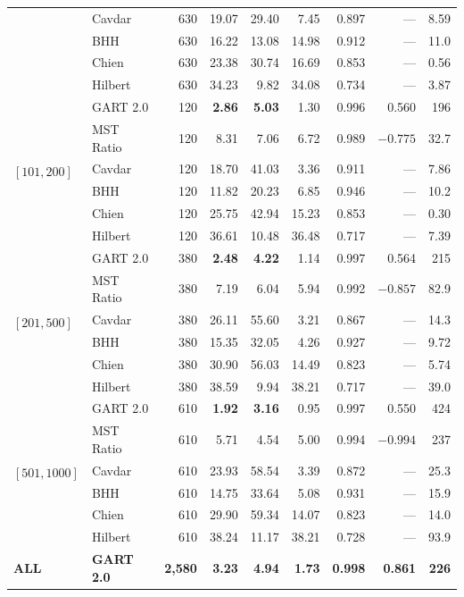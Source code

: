 \begin{table}[!ht]
{\begin{tabular}{@{}ll rrrrrrr@{}}
    & Cavdar & 630 & 19.07 & 29.40 & 7.45 & 0.897 & --- & 8.59 \\
    & BHH & 630 & 16.22 & 13.08 & 14.98 & 0.912 & --- & 11.0 \\
    & Chien & 630 & 23.38 & 30.74 & 16.69 & 0.853 & --- & 0.56 \\
    & Hilbert & 630 & 34.23 & 9.82 & 34.08 & 0.734 & --- & 3.87 \\
    \midrule
    \multirow{6}{*}{$[101,200]$}
    & GART 2.0 & 120 & \textbf{2.86} & \textbf{5.03} & 1.30 & 0.996 & 0.560 & 196 \\
    & MST Ratio & 120 & 8.31 & 7.06 & 6.72 & 0.989 & $-0.775$ & 32.7 \\
    & Cavdar & 120 & 18.70 & 41.03 & 3.36 & 0.911 & --- & 7.86 \\
    & BHH & 120 & 11.82 & 20.23 & 6.85 & 0.946 & --- & 10.2 \\
    & Chien & 120 & 25.75 & 42.94 & 15.23 & 0.853 & --- & 0.30 \\
    & Hilbert & 120 & 36.61 & 10.48 & 36.48 & 0.717 & --- & 7.39 \\
    \midrule
    \multirow{6}{*}{$[201,500]$}
    & GART 2.0 & 380 & \textbf{2.48} & \textbf{4.22} & 1.14 & 0.997 & 0.564 & 215 \\
    & MST Ratio & 380 & 7.19 & 6.04 & 5.94 & 0.992 & $-0.857$ & 82.9 \\
    & Cavdar & 380 & 26.11 & 55.60 & 3.21 & 0.867 & --- & 14.3 \\
    & BHH & 380 & 15.35 & 32.05 & 4.26 & 0.927 & --- & 9.72 \\
    & Chien & 380 & 30.90 & 56.03 & 14.49 & 0.823 & --- & 5.74 \\
    & Hilbert & 380 & 38.59 & 9.94 & 38.21 & 0.717 & --- & 39.0 \\
    \midrule
    \multirow{6}{*}{$[501,1000]$}
    & GART 2.0 & 610 & \textbf{1.92} & \textbf{3.16} & 0.95 & 0.997 & 0.550 & 424 \\
    & MST Ratio & 610 & 5.71 & 4.54 & 5.00 & 0.994 & $-0.994$ & 237 \\
    & Cavdar & 610 & 23.93 & 58.54 & 3.39 & 0.872 & --- & 25.3 \\
    & BHH & 610 & 14.75 & 33.64 & 5.08 & 0.931 & --- & 15.9 \\
    & Chien & 610 & 29.90 & 59.34 & 14.07 & 0.823 & --- & 14.0 \\
    & Hilbert & 610 & 38.24 & 11.17 & 38.21 & 0.728 & --- & 93.9 \\
    \midrule
    \multirow{6}{*}{\textbf{ALL}}
    & \textbf{GART 2.0} & \textbf{2{,}580} & \textbf{3.23} & \textbf{4.94} & \textbf{1.73} & \textbf{0.998} & \textbf{0.861} & \textbf{226} \\

\end{tabular}}
\end{table}
